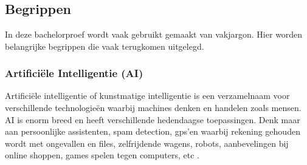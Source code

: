 
\chapter{}
\label{ch:inleiding}

%

\section{Begrippen}
\label{sec:begrippen}

In deze bachelorproef wordt vaak gebruikt gemaakt van vakjargon. Hier worden belangrijke begrippen die vaak terugkomen uitgelegd.

\subsection{Artificiële Intelligentie (AI)}
\label{subsec:begrippen-ai}

Artificiële intelligentie of kunstmatige intelligentie is een verzamelnaam voor verschillende technologieën waarbij machines denken en handelen zoals mensen. AI is enorm breed en heeft verschillende hedendaagse toepassingen. Denk maar aan persoonlijke assistenten, spam detection, gps’en waarbij rekening gehouden wordt met ongevallen en files, zelfrijdende wagens, robots, aanbevelingen bij online shoppen, games spelen tegen computers, etc \autocite{Fagella2020}.

